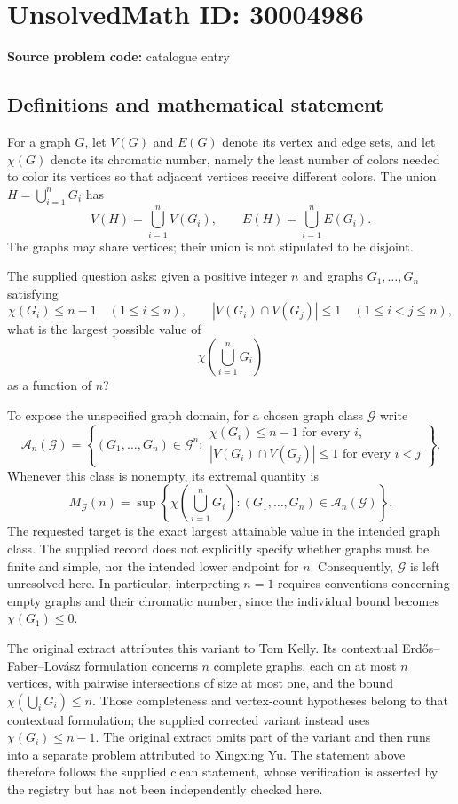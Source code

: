 \documentclass[11pt]{article}
\begin{document}
\section*{UnsolvedMath ID: 30004986}
\textbf{Source problem code:} catalogue entry
\subsection{Definitions and mathematical statement}
For a graph \(G\), let \(V(G)\) and \(E(G)\) denote its vertex and edge sets, and let \(\chi(G)\) denote its chromatic number, namely the least number of colors needed to color its vertices so that adjacent vertices receive different colors. The union \(H=\bigcup_{i=1}^{n}G_i\) has
\[
V(H)=\bigcup_{i=1}^{n}V(G_i),\qquad E(H)=\bigcup_{i=1}^{n}E(G_i).
\]
The graphs may share vertices; their union is not stipulated to be disjoint.

The supplied question asks: given a positive integer \(n\) and graphs \(G_1,\ldots,G_n\) satisfying
\[
\chi(G_i)\le n-1\quad(1\le i\le n),\qquad
|V(G_i)\cap V(G_j)|\le1\quad(1\le i<j\le n),
\]
what is the largest possible value of
\[
\chi\!\left(\bigcup_{i=1}^{n}G_i\right)
\]
as a function of \(n\)?

To expose the unspecified graph domain, for a chosen graph class \(\mathcal G\) write
\[
\mathcal A_n(\mathcal G)=\left\{(G_1,\ldots,G_n)\in\mathcal G^n:
\begin{array}{l}
\chi(G_i)\le n-1\text{ for every }i,\\
|V(G_i)\cap V(G_j)|\le1\text{ for every }i<j
\end{array}\right\}.
\]
Whenever this class is nonempty, its extremal quantity is
\[
M_{\mathcal G}(n)=\sup\left\{\chi\!\left(\bigcup_{i=1}^{n}G_i\right):(G_1,\ldots,G_n)\in\mathcal A_n(\mathcal G)\right\}.
\]
The requested target is the exact largest attainable value in the intended graph class. The supplied record does not explicitly specify whether graphs must be finite and simple, nor the intended lower endpoint for \(n\). Consequently, \(\mathcal G\) is left unresolved here. In particular, interpreting \(n=1\) requires conventions concerning empty graphs and their chromatic number, since the individual bound becomes \(\chi(G_1)\le0\).

The original extract attributes this variant to Tom Kelly. Its contextual Erd\H{o}s--Faber--Lov\'asz formulation concerns \(n\) complete graphs, each on at most \(n\) vertices, with pairwise intersections of size at most one, and the bound \(\chi(\bigcup_iG_i)\le n\). Those completeness and vertex-count hypotheses belong to that contextual formulation; the supplied corrected variant instead uses \(\chi(G_i)\le n-1\). The original extract omits part of the variant and then runs into a separate problem attributed to Xingxing Yu. The statement above therefore follows the supplied clean statement, whose verification is asserted by the registry but has not been independently checked here.
\end{document}
